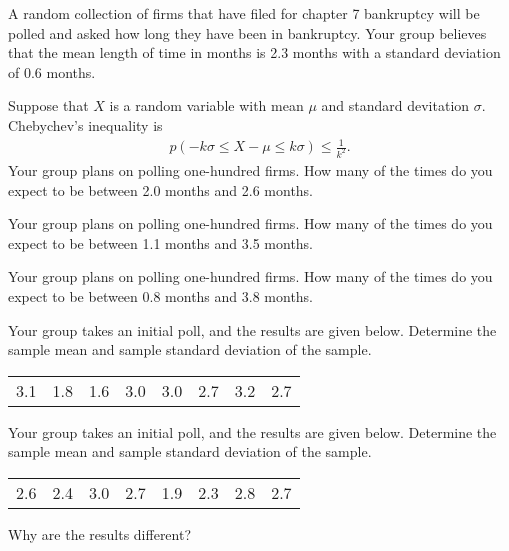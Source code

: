 \begin{problem}
\item A random collection of firms that have filed for chapter 7 bankruptcy will
  be polled and asked how long they have been in bankruptcy. Your
  group believes that the mean length of time in months is 2.3 months
  with a standard deviation of 0.6 months.

  \begin{subproblem}
  \item Suppose that $X$ is a random variable with mean $\mu$ and
    standard devitation $\sigma$. Chebychev's inequality is
    \begin{eqnarray*}
      p\left( -k \sigma \leq X - \mu \leq k \sigma \right) \leq \frac{1}{k^2}.
    \end{eqnarray*}
    Your group plans on polling one-hundred firms. How many of the
    times do you expect to be between 2.0 months and 2.6 months.

    \vfill

  \item Your group plans on polling one-hundred firms. How many of the
    times do you expect to be between 1.1 months and 3.5 months.

    \vfill

  \item Your group plans on polling one-hundred firms. How many of the
    times do you expect to be between 0.8 months and 3.8 months.

    \vfill

    \clearpage

  \item Your group takes an initial poll, and the results are given
    below. Determine the sample mean and sample standard deviation of
    the sample. \\
    \begin{tabular}{rrrrrrrr}
      3.1 & 1.8 & 1.6 & 3.0 & 3.0 & 2.7 & 3.2 & 2.7
    \end{tabular}

    \vfill

  \item Your group takes an initial poll, and the results are given
    below. Determine the sample mean and sample standard deviation of
    the sample. \\
    \begin{tabular}{rrrrrrrr}
      2.6 & 2.4 & 3.0 & 2.7 & 1.9 & 2.3 & 2.8 & 2.7
    \end{tabular}

    \vfill

  \item Why are the results different?

    \vspace{4em}

  \end{subproblem}

\end{problem}

